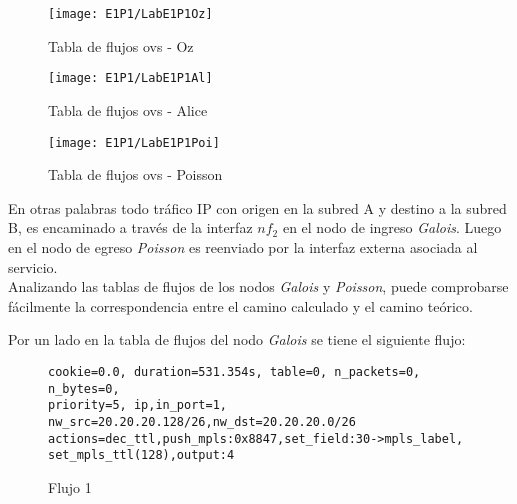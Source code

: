 \begin{figure}[h!] 
\centering    
\texttt{[image: E1P1/LabE1P1Oz]}
\caption[Tabla de flujos ovs - Oz]{Tabla de flujos ovs - Oz}
\label{fig:CU1P1DumpFlows2}
\end{figure}

\begin{figure}[h!] 
\centering    
\texttt{[image: E1P1/LabE1P1Al]}
\caption[Tabla de flujos ovs - Alice]{Tabla de flujos ovs - Alice}
\label{fig:CU1P1DumpFlows3}
\end{figure}

\begin{figure}[h!] 
\centering    
\texttt{[image: E1P1/LabE1P1Poi]}
\caption[Tabla de flujos ovs - Poisson]{Tabla de flujos ovs - Poisson}
\label{fig:CU1P1DumpFlows4}
\end{figure}

\newpage
En otras palabras todo tr\'afico IP con origen en la subred A y destino a la subred B, es encaminado a través de la interfaz $nf_2$ en el nodo de ingreso \textit{Galois}. Luego en el nodo de egreso \textit{Poisson} es reenviado por la interfaz externa asociada al servicio.\\

Analizando las tablas de flujos de los nodos \textit{Galois} y \textit{Poisson}, puede comprobarse fácilmente la correspondencia entre el camino calculado y el camino te\'orico.

Por un lado en la tabla de flujos del nodo \textit{Galois} se tiene el siguiente flujo:


\begin{figure}[h]
\texttt{cookie=0.0, duration=531.354s, table=0, n\_packets=0, n\_bytes=0, \\ 
priority=5, ip,in\_port=1, nw\_src=20.20.20.128/26,nw\_dst=20.20.20.0/26 \\
actions=dec\_ttl,push\_mpls:0x8847,set\_field:30->mpls\_label, \\
set\_mpls\_ttl(128),output:4}
\centering
\caption{Flujo 1}
\label{fig:Flujo1}
\end{figure}

